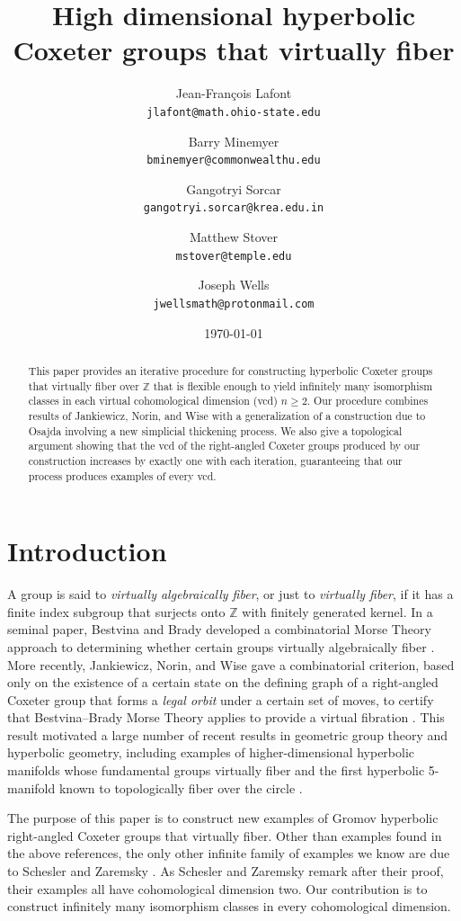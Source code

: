 \documentclass[12pt, letterpaper]{article}
\title{High dimensional hyperbolic Coxeter groups that virtually fiber}
\author{
    Jean-Fran\c{c}ois Lafont\\
    \texttt{jlafont@math.ohio-state.edu} \\
\and 
    Barry Minemyer \\
    \texttt{bminemyer@commonwealthu.edu} \\
\and 
    Gangotryi Sorcar \\
    \texttt{gangotryi.sorcar@krea.edu.in}
\and 
    Matthew Stover \\
    \texttt{mstover@temple.edu}
\and 
    Joseph Wells \\
    \texttt{jwellsmath@protonmail.com}
    }
\date{\today}
\newcommand{\Z}{\mathbb{Z}}
\def\Z{\mathbb{Z}}
\theoremstyle{plain}
\theoremstyle{definition}
\begin{document}
\maketitle

\begin{abstract}
    This paper provides an iterative procedure for constructing hyperbolic Coxeter groups that virtually fiber over $\Z$ that is flexible enough to yield infinitely many isomorphism classes in each virtual cohomological dimension (vcd) $n\geq 2$. Our procedure combines results of Jankiewicz, Norin, and Wise with a generalization of a construction due to Osajda involving a new simplicial thickening process. We also give a topological argument showing that the vcd of the right-angled Coxeter groups produced by our construction increases by exactly one with each iteration, guaranteeing that our process produces examples of every vcd.
\end{abstract}

\section{Introduction}

A group is said to \emph{virtually algebraically fiber}, or just to \emph{virtually fiber}, if it has a finite index subgroup that surjects onto $\Z$ with finitely generated kernel. In a seminal paper, Bestvina and Brady developed a combinatorial Morse Theory approach to determining whether certain groups virtually algebraically fiber \cite{BB}. More recently, Jankiewicz, Norin, and Wise gave a combinatorial criterion, based only on the existence of a certain state on the defining graph of a right-angled Coxeter group that forms a \emph{legal orbit} under a certain set of moves, to certify that Bestvina--Brady Morse Theory applies to provide a virtual fibration \cite{JNW}. This result motivated a large number of recent results in geometric group theory and hyperbolic geometry, including examples of higher-dimensional hyperbolic manifolds whose fundamental groups virtually fiber \cite{BM,IMM1,F} and the first hyperbolic 5-manifold known to topologically fiber over the circle \cite{IMM2}.

The purpose of this paper is to construct new examples of Gromov hyperbolic right-angled Coxeter groups that virtually fiber. Other than examples found in the above references, the only other infinite family of examples we know are due to Schesler and Zaremsky \cite[Thm.\ 10.2]{ScheslerZaremsky}. As Schesler and Zaremsky remark after their proof, their examples all have cohomological dimension two. Our contribution is to construct infinitely many isomorphism classes in every cohomological dimension.
\end{document}
